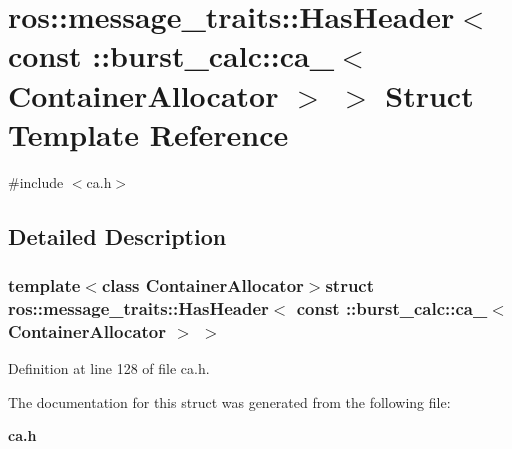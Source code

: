 \section{ros\-:\-:message\-\_\-traits\-:\-:\-Has\-Header$<$ const \-:\-:burst\-\_\-calc\-:\-:ca\-\_\-$<$ \-Container\-Allocator $>$ $>$ \-Struct \-Template \-Reference}
\label{structros_1_1message__traits_1_1HasHeader_3_01const_01_1_1burst__calc_1_1ca___3_01ContainerAllocator_01_4_01_4}


{\ttfamily \#include $<$ca.\-h$>$}



\subsection{\-Detailed \-Description}
\subsubsection*{template$<$class Container\-Allocator$>$struct ros\-::message\-\_\-traits\-::\-Has\-Header$<$ const \-::burst\-\_\-calc\-::ca\-\_\-$<$ Container\-Allocator $>$ $>$}



\-Definition at line 128 of file ca.\-h.



\-The documentation for this struct was generated from the following file\-:\begin{DoxyCompactItemize}
\item 
{\bf ca.\-h}\end{DoxyCompactItemize}
